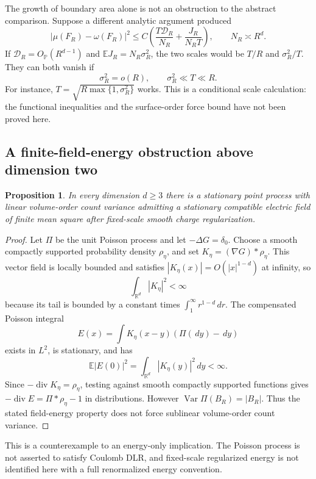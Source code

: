 \documentclass[11pt,reqno]{amsart}
\numberwithin{equation}{section}
\newtheorem{proposition}[theorem]{Proposition}
\theoremstyle{definition}
\newcommand{\R}{\mathbb R}
\newcommand{\E}{\mathbb E}
\newcommand{\Prob}{\mathbb P}
\newcommand{\1}{\mathbf 1}
\newcommand{\dd}{\,d}
\DeclareMathOperator{\Var}{Var}
\DeclareMathOperator{\diver}{div}
\begin{document}
The growth of boundary area alone is not an obstruction to the
abstract comparison. Suppose a different analytic argument produced
\[
|\mu(F_R)-\omega(F_R)|^2
\le C\left(\frac{T\mathcal D_R}{N_R}+
\frac{J_R}{N_RT}\right),\qquad N_R\asymp R^d.
\]
If $\mathcal D_R=O_{\Prob}(R^{d-1})$ and
$\E J_R=N_R\sigma_R^2$, the two scales would be $T/R$ and
$\sigma_R^2/T$. They can both vanish if
\[
\sigma_R^2=o(R),\qquad \sigma_R^2\ll T\ll R.
\]
For instance, $T=\sqrt{R\max\{1,\sigma_R^2\}}$ works.
This is a conditional scale calculation: the functional inequalities
and the surface-order force bound have not been proved here.

\subsection{A finite-field-energy obstruction above dimension two}
\begin{proposition}\label{lim:poisson}
In every dimension $d\ge3$ there is a stationary point process with
linear volume-order count variance admitting a stationary compatible
electric field of finite mean square after fixed-scale smooth charge
regularization.
\end{proposition}

\begin{proof}
Let $\Pi$ be the unit Poisson process and let $-\Delta G=\delta_0$.
Choose a smooth compactly supported probability density $\rho_\eta$,
and set $K_\eta=(\nabla G)*\rho_\eta$.
This vector field is locally bounded and satisfies
$|K_\eta(x)|=O(|x|^{1-d})$ at infinity, so
\[
\int_{\R^d}|K_\eta|^2<\infty
\]
because its tail is bounded by a constant times
$\int_1^\infty r^{1-d}\dd r$.
The compensated Poisson integral
\[
E(x)=\int K_\eta(x-y)(\Pi(\dd y)-\dd y)
\]
exists in $L^2$, is stationary, and has
\[
\E|E(0)|^2=\int_{\R^d}|K_\eta(y)|^2\dd y<\infty.
\]
Since $-\diver K_\eta=\rho_\eta$, testing against smooth compactly
supported functions gives
$-\diver E=\Pi*\rho_\eta-1$ in distributions.
However $\Var\Pi(B_R)=|B_R|$. Thus the stated field-energy property
does not force sublinear volume-order count variance.
\end{proof}

This is a counterexample to an energy-only implication. The Poisson
process is not asserted to satisfy Coulomb DLR, and fixed-scale
regularized energy is not identified here with a full renormalized
energy convention.
\end{document}
